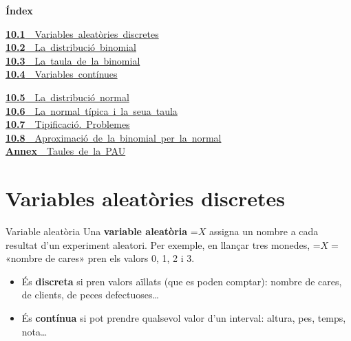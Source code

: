 \documentclass[11pt,a4paper]{article}
\newcommand{\fmm}[1]{\setbox0=\hbox{$#1$}\ifdim\wd0>\linewidth\[#1\]\else\mbox{\box0}\fi}
\begin{document}
\begin{tcolorbox}[colback=fmsurface,colframe=fmsurface,arc=3mm,left=4mm,right=4mm,top=2mm,bottom=2mm]
\small\textbf{Índex}\par\smallskip
\begin{minipage}[t]{0.42\linewidth}\small \mbox{\hyperlink{sec1}{\textbf{\color{fmgreen}10.1}\ \ Variables aleatòries discretes}}\\[3pt]
\mbox{\hyperlink{sec2}{\textbf{\color{fmgreen}10.2}\ \ La distribució binomial}}\\[3pt]
\mbox{\hyperlink{sec3}{\textbf{\color{fmgreen}10.3}\ \ La taula de la binomial}}\\[3pt]
\mbox{\hyperlink{sec4}{\textbf{\color{fmgreen}10.4}\ \ Variables contínues}}\\[3pt]\end{minipage}\hfill\begin{minipage}[t]{0.56\linewidth}\small \mbox{\hyperlink{sec5}{\textbf{\color{fmgreen}10.5}\ \ La distribució normal}}\\[3pt]
\mbox{\hyperlink{sec6}{\textbf{\color{fmgreen}10.6}\ \ La normal típica i la seua taula}}\\[3pt]
\mbox{\hyperlink{sec7}{\textbf{\color{fmgreen}10.7}\ \ Tipificació. Problemes}}\\[3pt]
\mbox{\hyperlink{sec8}{\textbf{\color{fmgreen}10.8}\ \ Aproximació de la binomial per la normal}}\\[3pt]
\mbox{\hyperlink{annex}{\textbf{\color{fmgreen}Annex}\ \ Taules de la PAU}}\\[3pt]\end{minipage}
\end{tcolorbox}

\section{Variables aleatòries discretes}\hypertarget{sec1}{}

  

  
\begin{fmdef}{Variable aleatòria}
Una \textbf{variable aleatòria} \fmm{X} assigna un nombre a cada resultat d'un experiment aleatori. Per exemple, en llançar tres monedes, \fmm{X=}«nombre de cares» pren els valors 0, 1, 2 i 3.

      
\begin{itemize}
\item És \textbf{discreta} si pren valors aïllats (que es poden comptar): nombre de cares, de clients, de peces defectuoses\dots{}
\item És \textbf{contínua} si pot prendre qualsevol valor d'un interval: altura, pes, temps, nota\dots{}
\end{itemize}
\end{fmdef}
\end{document}

